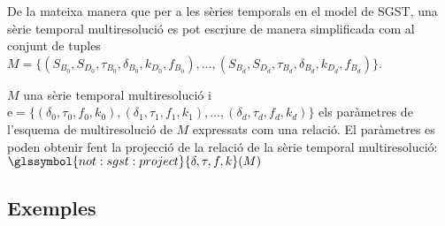 De la mateixa manera que per a les sèries temporals en el model de
SGST, una sèrie temporal multiresolució es pot escriure de manera
simplificada com al conjunt de tuples $M = \{ (S_{B_0}, S_{D_0} ,
\tau_{B_0}, \delta_{B_0}, k_{D_0}, f_{B_0} ), \dotsc, (S_{B_d},
S_{D_d} , \tau_{B_d}, \delta_{B_d}, k_{D_d}, f_{B_d} ) \}$.




$M$ una sèrie temporal
multiresolució i $\text{e} = \{ (\delta_0,\tau_0,f_0,k_0),
(\delta_1,\tau_1,f_1,k_1), \ldots, (\delta_d,\tau_d,f_d,k_d)\}$ els
paràmetres de l'esquema de multiresolució de $M$ expressats com una relació. El paràmetres es poden obtenir fent la projecció de la relació de la sèrie temporal multiresolució: $\glssymbol{not:sgst:project}{\delta,\tau,f,k}(M)$


\subsection{Exemples}

